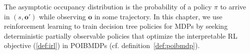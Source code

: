 The asymptotic occupancy distribution is the probability of a policy $\pi$ to arrive in $(s,\boldsymbol{o}')$ while observing $\boldsymbol{o}$ in some trajectory.  
In this chapter, we use reinforcement learning to train decision tree policies for MDPs by seeking deterministic partially observable policies that optimize the interpretable RL objective (\ref{def:irl}) in POIBMDPs (cf. definition~\ref{def:poibmdp}).

    
    
    
    

    
    

